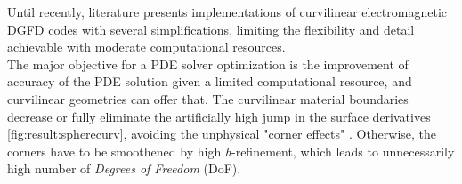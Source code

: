 \noindent
Until recently, literature presents implementations of curvilinear electromagnetic DGFD codes with several simplifications, limiting the flexibility and detail achievable with moderate computational resources. \\

\noindent
The major objective for a PDE solver optimization is the improvement of accuracy of the PDE solution given a limited computational resource, and curvilinear geometries can offer that. The curvilinear material boundaries decrease or fully eliminate the artificially high jump in the surface derivatives \cref{fig:result:spherecurv}, avoiding the unphysical "corner effects" \cite{volakis1998, jin2014}. Otherwise, the corners have to be smoothened by high \textit{h}-refinement, which leads to unnecessarily high number of \textit{Degrees of Freedom} (DoF). \\


